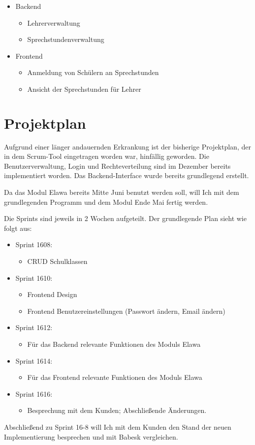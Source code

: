 \documentclass[a4paper,10pt]{scrartcl}
\begin{document}
  \begin{itemize}
    \item Backend
    \begin{itemize}
      \item Lehrerverwaltung
      \item Sprechstundenverwaltung
    \end{itemize}
    \item Frontend
    \begin{itemize}
      \item Anmeldung von Schülern an Sprechstunden
      \item Ansicht der Sprechstunden für Lehrer
    \end{itemize}
  \end{itemize}

\section{Projektplan}

  Aufgrund einer länger andauernden Erkrankung ist der bisherige Projektplan,
  der in dem Scrum-Tool eingetragen worden war, hinfällig geworden.
  Die Benutzerverwaltung, Login und Rechteverteilung sind im Dezember bereits
  implementiert worden.
  Das Backend-Interface wurde bereits grundlegend erstellt.

  Da das Modul Elawa bereits Mitte Juni benutzt werden soll, will Ich mit dem
  grundlegenden Programm und dem Modul Ende Mai fertig werden.

  Die Sprints sind jeweils in 2 Wochen aufgeteilt.
  Der grundlegende Plan sieht wie folgt aus:

  \begin{itemize}
    \item Sprint 1608:
    \begin{itemize}
      \item CRUD Schulklassen
    \end{itemize}
    \item Sprint 1610:
    \begin{itemize}
      \item Frontend Design
      \item Frontend Benutzereinstellungen (Passwort ändern, Email ändern)
    \end{itemize}
    \item Sprint 1612:
    \begin{itemize}
      \item Für das Backend relevante Funktionen des Moduls Elawa
    \end{itemize}
    \item Sprint 1614:
    \begin{itemize}
      \item Für das Frontend relevante Funktionen des Moduls Elawa
    \end{itemize}
    \item Sprint 1616:
    \begin{itemize}
      \item Besprechung mit dem Kunden; Abschließende Änderungen.
    \end{itemize}
  \end{itemize}

  Abschließend zu Sprint 16-8 will Ich mit dem Kunden den Stand der neuen
  Implementierung besprechen und mit Babesk vergleichen.
\end{document}

